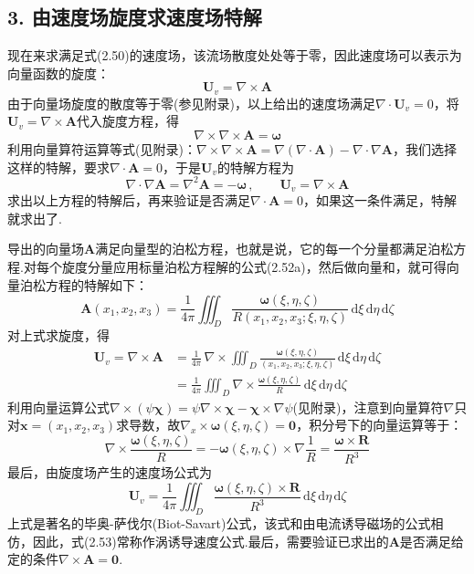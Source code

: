 \subsection*{3. 由速度场旋度求速度场特解}

现在来求满足式(2.50)的速度场，该流场散度处处等于零，因此速度场可以表示为向量函数的旋度：
\[
\boldsymbol{U}_v=\nabla\times\boldsymbol{A}
\]
由于向量场旋度的散度等于零(参见附录)，以上给出的速度场满足$\nabla\cdot\boldsymbol{U}_v=0$，将$\boldsymbol{U}_v=\nabla\times\boldsymbol{A}$代入旋度方程，得
\[
\nabla\times\nabla\times\boldsymbol{A}=\boldsymbol{\omega}
\]
利用向量算符运算等式(见附录)：$\nabla\times\nabla\times\boldsymbol{A}=\nabla(\nabla\cdot\boldsymbol{A})-\nabla\cdot\nabla\boldsymbol{A}$，我们选择这样的特解，要求$\nabla\cdot\boldsymbol{A}=0$，于是$\boldsymbol{U}_v$的特解方程为
\[
\nabla\cdot\nabla\boldsymbol{A}=\nabla^{2}\boldsymbol{A}=-\boldsymbol{\omega}\,,\qquad \boldsymbol{U}_v=\nabla\times\boldsymbol{A}
\]
求出以上方程的特解后，再来验证是否满足$\nabla\cdot\boldsymbol{A}=0$，如果这一条件满足，特解就求出了.

导出的向量场$\boldsymbol{A}$满足向量型的泊松方程，也就是说，它的每一个分量都满足泊松方程.对每个旋度分量应用标量泊松方程解的公式(2.52a)，然后做向量和，就可得向量泊松方程的特解如下：
\[
\boldsymbol{A}(x_1,x_2,x_3)=\frac{1}{4\pi}\iiint_D \frac{\boldsymbol{\omega}(\xi,\eta,\zeta)}{R(x_1,x_2,x_3;\xi,\eta,\zeta)}\,\mathrm{d}\xi\,\mathrm{d}\eta\,\mathrm{d}\zeta
\]
对上式求旋度，得
\begin{align*}
\boldsymbol{U}_v=\nabla\times\boldsymbol{A}&=\frac{1}{4\pi}\,\nabla\times\iiint_D \frac{\boldsymbol{\omega}(\xi,\eta,\zeta)}{(x_1,x_2,x_3;\xi,\eta,\zeta)}\,\mathrm{d}\xi\,\mathrm{d}\eta\,\mathrm{d}\zeta\\
&=\frac{1}{4\pi}\iiint_D \nabla\times\frac{\boldsymbol{\omega}(\xi,\eta,\zeta)}{R}\,\mathrm{d}\xi\,\mathrm{d}\eta\,\mathrm{d}\zeta
\end{align*}
利用向量运算公式$\nabla\times(\psi\boldsymbol{\chi})=\psi\nabla\times\boldsymbol{\chi}-\boldsymbol{\chi}\times\nabla\psi$(见附录)，注意到向量算符$\nabla$只对$\boldsymbol{x}=(x_1,x_2,x_3)$求导数，故$\nabla_x\times\boldsymbol{\omega}(\xi,\eta,\zeta)=\boldsymbol{0}$，积分号下的向量运算等于：
\[
\nabla\times\frac{\boldsymbol{\omega}(\xi,\eta,\zeta)}{R}=-\boldsymbol{\omega}(\xi,\eta,\zeta)\times\nabla\frac{1}{R}=\frac{\boldsymbol{\omega}\times\boldsymbol{R}}{R^{3}}
\]
最后，由旋度场产生的速度场公式为
\begin{equation*}
\boldsymbol{U}_v=\frac{1}{4\pi}\iiint_D \frac{\boldsymbol{\omega}(\xi,\eta,\zeta)\times\boldsymbol{R}}{R^{3}}\,\mathrm{d}\xi\,\mathrm{d}\eta\,\mathrm{d}\zeta
\tag{2.53}
\end{equation*}
上式是著名的毕奥-萨伐尔(Biot-Savart)公式，该式和由电流诱导磁场的公式相仿，因此，式(2.53)常称作涡诱导速度公式.最后，需要验证已求出的$\boldsymbol{A}$是否满足给定的条件$\nabla\times\boldsymbol{A}=\boldsymbol{0}$.

